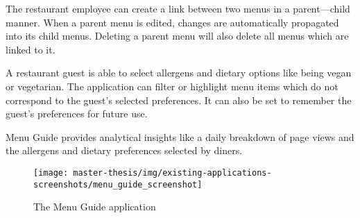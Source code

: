   The restaurant employee can create a link between two menus in a parent---child manner.
  When a parent menu is edited, changes are automatically propagated into its child menus.
  Deleting a parent menu will also delete all menus which are linked to it.

  A restaurant guest is able to select allergens and dietary options like being vegan or vegetarian.
  The application can filter or highlight menu items which do not correspond to the guest's selected preferences.
  It can also be set to remember the guest's preferences for future use.

  Menu Guide provides analytical insights like a daily breakdown of page views and the allergens and dietary preferences selected by diners.

  \begin{figure}[h]
    \centering
    \texttt{[image: master-thesis/img/existing-applications-screenshots/menu\_guide\_screenshot]}
    \caption{The Menu Guide application}
  \end{figure}


